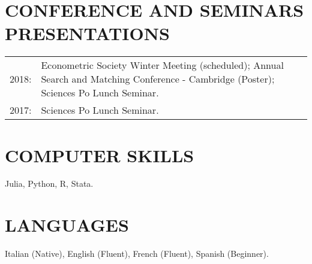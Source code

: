 \documentclass{res}
\begin{document}
\begin{resume}
\section{\small CONFERENCE AND SEMINARS PRESENTATIONS}
 \vspace{5pt}
 \begin{tabular}{@{}p{0.6in}p{5.7in}}
    2018: & Econometric Society Winter Meeting (scheduled); Annual Search and Matching Conference - Cambridge (Poster); Sciences Po Lunch Seminar. \\
	2017: & Sciences Po Lunch Seminar.
\end{tabular}
	 \vspace{5pt}

\section{\small COMPUTER SKILLS}
   \vspace{5pt}
	Julia, Python, R, Stata.

\section{\small LANGUAGES}
   \vspace{5pt}
    Italian (Native), English (Fluent), French (Fluent), Spanish (Beginner).
    
\end{resume}
\end{document}
